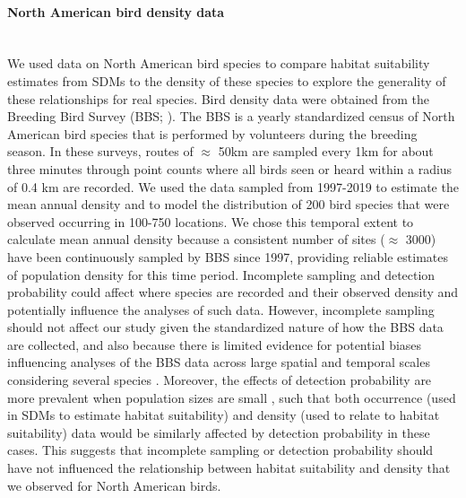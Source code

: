 \paragraph*{North American bird density data}\mbox{}\\
We used data on North American bird species to compare habitat suitability estimates from SDMs to the density of these species to explore the generality of these relationships for real species. Bird density data were obtained from the Breeding Bird Survey (BBS; \textcite{sauer2020}). The BBS is a yearly standardized census of North American bird species that is performed by volunteers during the breeding season. In these surveys, routes of $\approx$ 50km are sampled every 1km for about three minutes through point counts where all birds seen or heard within a radius of 0.4 km are recorded. We used the data sampled from 1997-2019 to estimate the mean annual density and to model the distribution of 200 bird species that were observed occurring in 100-750 locations. We chose this temporal extent to calculate mean annual density because a consistent number of sites ($\approx$ 3000) have been continuously sampled by BBS since 1997, providing reliable estimates of population density for this time period. Incomplete sampling and detection probability could affect where species are recorded and their observed density and potentially influence the analyses of such data. However, incomplete sampling should not affect our study given the standardized nature of how the BBS data are collected, and also because there is limited evidence for potential biases influencing analyses of the BBS data across large spatial and temporal scales considering several species \parencite{rosenberg2019}. Moreover, the effects of detection probability are more prevalent when population sizes are small \parencite{tanadini2011, bennett2024}, such that both occurrence (used in SDMs to estimate habitat suitability) and density (used to relate to habitat suitability) data would be similarly affected by detection probability in these cases. This suggests that incomplete sampling or detection probability should have not influenced the relationship between habitat suitability and density that we observed for North American birds.

